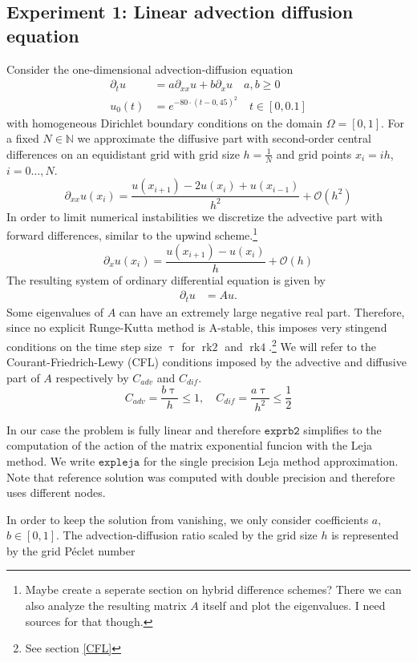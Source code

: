\documentclass{scrartcl}
\begin{document}
\subsection{Experiment 1: Linear advection diffusion equation}
Consider the one-dimensional advection-diffusion equation
\begin{align*}
\partial_tu &= a\partial_{xx}u + b\partial_xu \quad a,b\ge 0\\
u_0(t) &= e^{-80\cdot(t-0,45)^2} \quad t\in[0,0.1]
\end{align*}
with homogeneous Dirichlet boundary conditions on the domain $\Omega = [0,1]$. 
For a fixed $N\in\mathbb N$ we approximate the diffusive part with second-order central differences on an equidistant grid with grid size $h = \frac{1}{N}$ and grid points $x_i = ih$, $i=0\dots,N$.
\[\partial_{xx}u(x_i) = \frac{u(x_{i+1}) - 2u(x_i) + u(x_{i-1})}{{h}^2} + \mathcal{O}({h}^2)\]
In order to limit numerical instabilities we discretize the advective part with forward differences, similar to the upwind scheme.\footnote{Maybe create a seperate section on hybrid difference schemes? There we can also analyze the resulting matrix $A$ itself and plot the eigenvalues. I need sources for that though.}
\[\partial_{x}u(x_i) = \frac{u(x_{i+1}) - u(x_i)}{h} + \mathcal{O}(h)\]
The resulting system of ordinary differential equation is given by
\begin{align*}
\partial_tu &= Au.
\end{align*} 
Some eigenvalues of $A$ can have an extremely large negative real part. Therefore, since no explicit Runge-Kutta method is A-stable, this imposes very stingend conditions on the time step size $\uptau$ for $\operatorname{rk2}$ and $\operatorname{rk4}$.\footnote{See section \ref{CFL}} We will refer to the Courant-Friedrich-Lewy (CFL) conditions imposed by the advective and diffusive part of $A$ respectively by $C_{adv}$ and $C_{dif}$.  
\[ C_{adv} = \frac{b\uptau}{h} \le 1, \quad C_{dif} = \frac{a\uptau}{h^2} \le \frac{1}{2}\] 



In our case the problem is fully linear and therefore $\texttt{exprb2}$ simplifies to the computation of the action of the matrix exponential funcion with the Leja method. We write $\texttt{expleja}$ for the single precision Leja method approximation. Note that reference solution was computed with double precision and therefore uses different nodes.

In order to keep the solution from vanishing, we only consider coefficients $a$, $b\in[0,1]$. The advection-diffusion ratio scaled by the grid size $h$ is represented by the grid P\'eclet number
\end{document}

